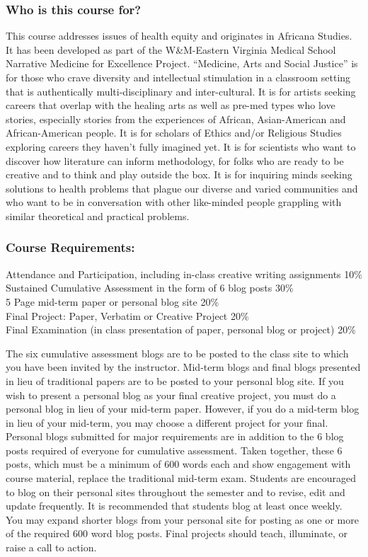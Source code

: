 \documentclass[12pt]{article}
\begin{document}
\subsubsection{Who is this course for?}\label{who-is-this-course-for}

This course addresses issues of health equity and originates in Africana
Studies. It has been developed as part of the W\&M-Eastern Virginia
Medical School Narrative Medicine for Excellence Project. ``Medicine,
Arts and Social Justice'' is for those who crave diversity and
intellectual stimulation in a classroom setting that is authentically
multi-disciplinary and inter-cultural. It is for artists seeking careers
that overlap with the healing arts as well as pre-med types who love
stories, especially stories from the experiences of African,
Asian-American and African-American people. It is for scholars of Ethics
and/or Religious Studies exploring careers they haven't fully imagined
yet. It is for scientists who want to discover how literature can inform
methodology, for folks who are ready to be creative and to think and
play outside the box. It is for inquiring minds seeking solutions to
health problems that plague our diverse and varied communities and who
want to be in conversation with other like-minded people grappling with
similar theoretical and practical problems.

\subsubsection{Course Requirements:}\label{course-requirements}

Attendance and Participation, including in-class creative writing
assignments 10\%\\
Sustained Cumulative Assessment in the form of 6 blog posts 30\%\\
5 Page mid-term paper or personal blog site 20\%\\
Final Project: Paper, Verbatim or Creative Project 20\%\\
Final Examination (in class presentation of paper, personal blog or
project) 20\%

The six cumulative assessment blogs are to be posted to the class site
to which you have been invited by the instructor. Mid-term blogs and
final blogs presented in lieu of traditional papers are to be posted to
your personal blog site. If you wish to present a personal blog as your
final creative project, you must do a personal blog in lieu of your
mid-term paper. However, if you do a mid-term blog in lieu of your
mid-term, you may choose a different project for your final. Personal
blogs submitted for major requirements are in addition to the 6 blog
posts required of everyone for cumulative assessment. Taken together,
these 6 posts, which must be a minimum of 600 words each and show
engagement with course material, replace the traditional mid-term exam.
Students are encouraged to blog on their personal sites throughout the
semester and to revise, edit and update frequently. It is recommended
that students blog at least once weekly. You may expand shorter blogs
from your personal site for posting as one or more of the required 600
word blog posts. Final projects should teach, illuminate, or raise a
call to action.
\end{document}
